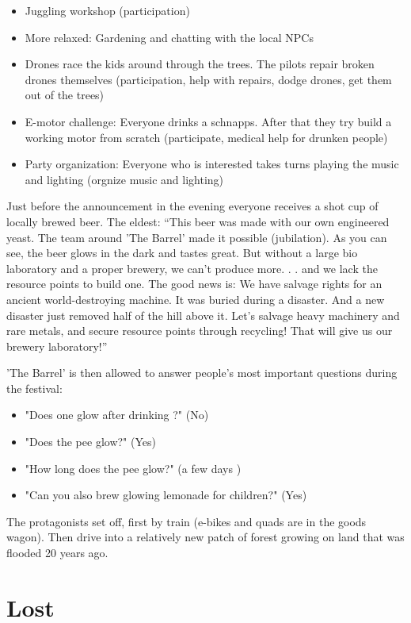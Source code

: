 \begin{itemize}
\item Juggling workshop (participation)
\item More relaxed: Gardening and chatting with the local NPCs
\item Drones race the kids around through the trees. The pilots repair broken drones themselves (participation, help with repairs, dodge drones, get them out of the trees)
\item E-motor challenge: Everyone drinks a schnapps. After that they try build a working motor from scratch (participate, medical help for drunken people)
\item Party organization: Everyone who is interested takes turns playing the music and lighting (orgnize music and lighting)
\end{itemize}

Just before the announcement in the evening everyone receives a shot cup of locally brewed beer. The eldest: “This beer was made with our own engineered yeast. The team around 'The Barrel' made it possible (jubilation). As you can see, the beer glows in the dark and tastes great. But without a large bio laboratory and a proper brewery, we can't produce more. . . and we lack the resource points to build one. The good news is: We have salvage rights for an ancient world-destroying machine. It was buried during a  disaster. And a new disaster just removed half of the hill above it. Let's salvage heavy machinery and rare metals, and secure resource points through recycling! That will give us our brewery laboratory!”

'The Barrel' is then allowed to answer people's most important questions during the festival: 
\begin{itemize}
\item "Does one glow after drinking ?" (No)
\item "Does the pee glow?" (Yes)
\item "How long does the pee glow?" (a few days )
\item "Can you also brew glowing lemonade for children?" (Yes)
\end{itemize}

The protagonists set off, first by train (e-bikes and quads are in the goods wagon). Then drive into a relatively new patch of forest growing on land that was flooded 20 years ago.


\section{Lost}

